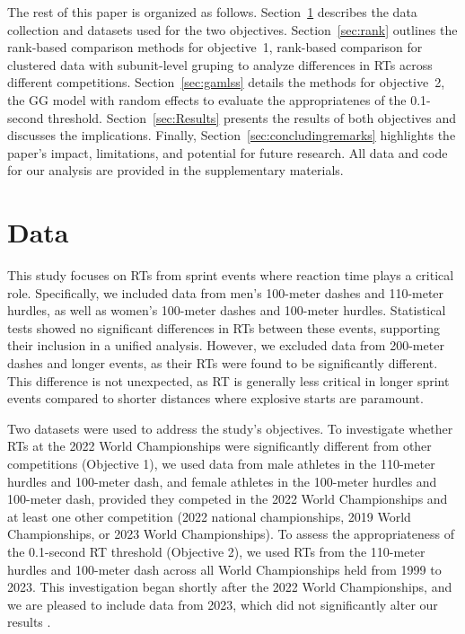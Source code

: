 \documentclass[12pt, letterpaper]{article}
\begin{document}
The rest of this paper is organized as follows. Section~\ref{sec:Data}
describes the data collection and datasets used for the two
objectives. Section~\ref{sec:rank} outlines the rank-based comparison
methods for objective~1, rank-based comparison for clustered data with
subunit-level gruping to analyze differences in RTs across different
competitions. Section~\ref{sec:gamlss} details the methods for
objective~2, the GG model with random effects to evaluate the appropriatenes
of the 0.1-second threshold. Section~\ref{sec:Results} presents the
results of both objectives and discusses the implications.
Finally, Section~\ref{sec:concludingremarks} highlights the
paper’s impact, limitations, and potential for future research.
All data and code for our analysis are provided in the supplementary
materials.



\section{Data}
\label{sec:Data}


This study focuses on RTs from sprint events where reaction
time plays a critical role. Specifically, we included data from men’s
100-meter dashes and 110-meter hurdles, as well as women’s 100-meter
dashes and 100-meter hurdles. Statistical tests showed no significant
differences in RTs between these events, supporting their
inclusion in a unified analysis. However, we excluded data from
200-meter dashes and longer events, as their RTs were found
to be significantly different. This difference is not unexpected, as
RT is generally less critical in longer sprint events
compared to shorter distances where explosive starts are paramount.


Two datasets were used to address the study's objectives. To
investigate whether RTs at the 2022 World Championships
were significantly different from other competitions (Objective 1), we
used data from male athletes in the 110-meter hurdles and 100-meter
dash, and female athletes in the 100-meter hurdles and 100-meter dash,
provided they competed in the 2022 World Championships and at least
one other competition (2022 national championships, 2019 World
Championships, or 2023 World Championships). To assess the
appropriateness of the 0.1-second RT threshold (Objective
2), we used RTs from the 110-meter hurdles and 100-meter
dash across all World Championships held from 1999 to 2023. This
investigation began shortly after the 2022 World Championships, and we
are pleased to include data from 2023, which did not significantly
alter our results \citep{WAData}.
\end{document}
